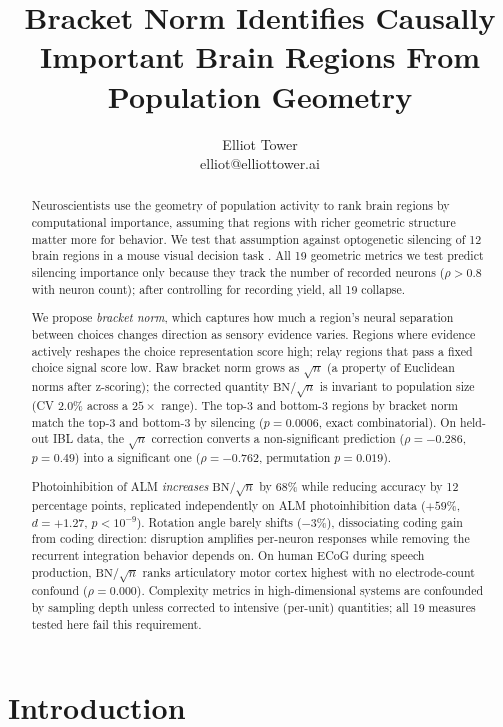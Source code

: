 \documentclass{article}
\title{Bracket Norm Identifies Causally Important Brain Regions From Population Geometry}
\author{\name Elliot Tower \\
      \email elliot@elliottower.ai}
\begin{document}
\maketitle

\begin{abstract}
Neuroscientists use the geometry of population activity to rank brain regions by computational importance, assuming that regions with richer geometric structure matter more for behavior. We test that assumption against optogenetic silencing of 12 brain regions in a mouse visual decision task \citep{steinmetz2019distributed, zatkahaas2021}. All 19 geometric metrics we test predict silencing importance only because they track the number of recorded neurons ($\rho > 0.8$ with neuron count); after controlling for recording yield, all 19 collapse.

We propose \emph{bracket norm}, which captures how much a region's neural separation between choices changes direction as sensory evidence varies. Regions where evidence actively reshapes the choice representation score high; relay regions that pass a fixed choice signal score low. Raw bracket norm grows as $\sqrt{n}$ (a property of Euclidean norms after z-scoring); the corrected quantity $\text{BN}/\!\sqrt{n}$ is invariant to population size (CV $2.0\%$ across a $25\times$ range). The top-3 and bottom-3 regions by bracket norm match the top-3 and bottom-3 by silencing ($p = 0.0006$, exact combinatorial). On held-out IBL data, the $\sqrt{n}$ correction converts a non-significant prediction ($\rho = -0.286$, $p = 0.49$) into a significant one ($\rho = -0.762$, permutation $p = 0.019$).

Photoinhibition of ALM \emph{increases} $\text{BN}/\!\sqrt{n}$ by 68\% while reducing accuracy by 12 percentage points, replicated independently on ALM photoinhibition data \citep{dandi000007, dandi000009} ($+59\%$, $d = +1.27$, $p < 10^{-9}$). Rotation angle barely shifts ($-3\%$), dissociating coding gain from coding direction: disruption amplifies per-neuron responses while removing the recurrent integration behavior depends on. On human ECoG during speech production, $\text{BN}/\!\sqrt{n}$ ranks articulatory motor cortex highest with no electrode-count confound ($\rho = 0.000$). Complexity metrics in high-dimensional systems are confounded by sampling depth unless corrected to intensive (per-unit) quantities; all 19 measures tested here fail this requirement.
\end{abstract}

\section{Introduction}
\end{document}
